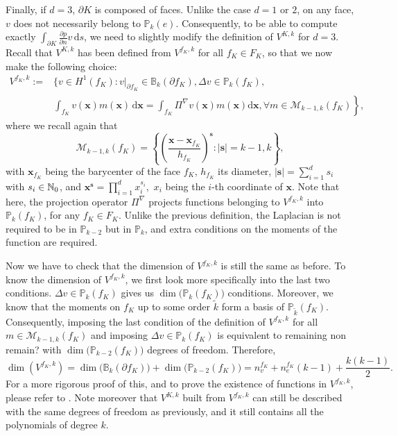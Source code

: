 Finally, if $d=3$, $\partial K$ is composed of faces. Unlike the case $d=1$ or $2$, on any face, $v$ does not necessarily belong to $\mathbb{P}_k(e)$. Consequently, to be able to compute exactly $\int_{\partial K} \frac{\partial p}{\partial n} v \, \mathrm{d}s$, we need to  slightly modify the definition of $V^{K,k}$ for $d=3$. Recall that $V^{K,k}$ has been defined from $V^{f_K,k}$ for all $f_K\in F_K$, so that we now make the following choice:
\begin{align*}
V^{f_K,k} := &\Bigg\{v\in H^1(f_K) : v|_{\partial f_K} \in \mathbb{B}_k(\partial f_K), \Delta v\in \mathbb{P}_{k}(f_K), \\
&\left. \int_{f_K} v(\mathbf{x}) m(\mathbf{x}) \, \mathrm{d}\mathbf{x} = \int_{f_K} \Pi^\nabla v(\mathbf{x}) m(\mathbf{x})\mathrm{d}\mathbf{x}, \forall m\in\mathcal{M}_{k-1,k}(f_K) \right\},
\end{align*}
where we recall again that $$\mathcal{M}_{k-1,k}(f_K) = \left\{\left(\frac{\mathbf{x}- \mathbf{x}_{f_K}}{h_{f_K}}\right)^\mathbf{s} : |\mathbf{s}|= k-1, k\right\},$$ with $\mathbf{x}_{f_K}$ being the barycenter of the face $f_K$, $h_{f_K}$ its diameter, $|\mathbf{s}| = \sum_{i=1}^d s_i$ with $s_i\in \mathbb{N}_0$, and $\mathbf{x}^\mathbf{s}=\prod_{i=1}^d x_i^{s_i},$ $x_i$ being the $i$-th coordinate of $\mathbf{x}$. Note that here, the projection operator $\Pi^\nabla$ projects functions belonging to $V^{f_K,k}$ into $\mathbb{P}_k(f_K)$, for any $f_K\in F_K$. 
Unlike the previous definition, the Laplacian is not required to be in $\mathbb{P}_{k-2}$ but in $\mathbb{P}_k$, and extra conditions on the moments of the function are required.

Now we have to check that the dimension of $V^{f_K,k}$ is still the same as before. 
To know the dimension of $V^{f_K,k}$, we first look more specifically into the last two conditions. $\Delta v\in\mathbb{P}_k(f_K)$ gives us $\dim\big(\mathbb{P}_k(f_K)\big)$ conditions. Moreover, we know that the moments on $f_K$ up to some order $\tilde{k}$ form a basis of $\mathbb{P}_{\tilde{k}}(f_K)$. Consequently, imposing the last condition of the definition of $V^{f_K,k}$ for all $m\in\mathcal{M}_{k-1,k}(f_K)$ and imposing $\Delta v\in\mathbb{P}_k(f_K)$ is equivalent to remaining {\color{red} non remain?} with $\dim\big(\mathbb{P}_{k-2}(f_K)\big)$ degrees of freedom. Therefore, 
$$\dim\left(V^{f_K,k}\right) = \dim\big(\mathbb{B}_k\left(\partial f_K\right)\big)+\dim\big(\mathbb{P}_{k-2}(f_K)\big)= n_v^{f_K} + n_e^{f_K}(k-1) + \frac{k(k-1)}{2}.$$
For a more rigorous proof of this, and to prove the existence of functions in $V^{f_K,k}$, please refer to \cite{existenceW}. Note moreover that $V^{K,k}$ built from $V^{f_K,k}$ can still be described with the same degrees of freedom as previously, and it still contains all the polynomials of degree $k$. 

